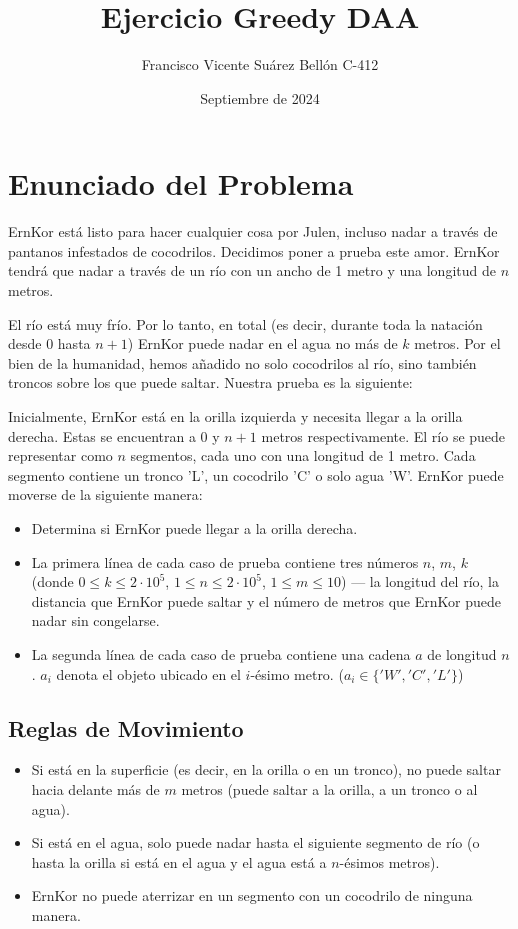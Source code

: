 \documentclass{article}
\title{Ejercicio Greedy DAA}
\author{Francisco Vicente Suárez Bellón C-412}
\date{Septiembre de 2024}
\begin{document}
\maketitle

\pagebreak %

\section{Enunciado del Problema}

ErnKor está listo para hacer cualquier cosa por Julen, incluso nadar a través de pantanos infestados de cocodrilos. Decidimos poner a prueba este amor. ErnKor tendrá que nadar a través de un río con un ancho de 1 metro y una longitud de \(n\) metros.

El río está muy frío. Por lo tanto, en total (es decir, durante toda la natación desde 0 hasta \(n+1\)) ErnKor puede nadar en el agua no más de \(k\) metros. Por el bien de la humanidad, hemos añadido no solo cocodrilos al río, sino también troncos sobre los que puede saltar. Nuestra prueba es la siguiente:

Inicialmente, ErnKor está en la orilla izquierda y necesita llegar a la orilla derecha. Estas se encuentran a 0 y \(n+1\) metros respectivamente. El río se puede representar como \(n\) segmentos, cada uno con una longitud de 1 metro. Cada segmento contiene un tronco 'L', un cocodrilo 'C' o solo agua 'W'. ErnKor puede moverse de la siguiente manera:

\begin{itemize}
    \item Determina si ErnKor puede llegar a la orilla derecha.
    \item La primera línea de cada caso de prueba contiene tres números \(n\), \(m\), \(k\) (donde \(0 \leq k \leq 2 \cdot 10^5\), \(1 \leq n \leq 2 \cdot 10^5\), \(1 \leq m \leq 10\)) — la longitud del río, la distancia que ErnKor puede saltar y el número de metros que ErnKor puede nadar sin congelarse.
    \item La segunda línea de cada caso de prueba contiene una cadena \(a\) de longitud \(n\). \(a_i\) denota el objeto ubicado en el \(i\)-ésimo metro. (\(a_i \in \{ 'W', 'C', 'L' \}\))
\end{itemize}

\subsection{Reglas de Movimiento}
\begin{itemize}
    \item Si está en la superficie (es decir, en la orilla o en un tronco), no puede saltar hacia delante más de \(m\) metros (puede saltar a la orilla, a un tronco o al agua).
    \item Si está en el agua, solo puede nadar hasta el siguiente segmento de río (o hasta la orilla si está en el agua y el agua está a \(n\)-ésimos metros).
    \item ErnKor no puede aterrizar en un segmento con un cocodrilo de ninguna manera.
\end{itemize}
\end{document}
